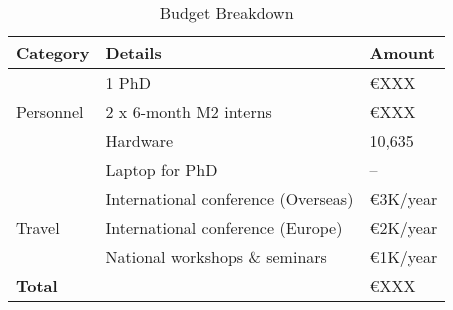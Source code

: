 \documentclass[11pt, a4paper]{article}
\begin{document}

\begin{table}[H]
    \centering
   \caption{Budget Breakdown}
    \begin{tabular}{ll|l}
        \toprule
        \textbf{Category} & \textbf{Details} & \textbf{Amount} \\
        \midrule
        \multirow{3}{*}{Personnel} 
            & 1 PhD & €XXX \\
            & 2 x 6-month M2 interns & €XXX \\
        \midrule
        \multirow{2}{*}{Equipment} 
            & Hardware & 10,635 \\
            & Laptop for PhD & -- \\
        \midrule
        \multirow{3}{*}{Travel} 
            & International conference (Overseas) & €3K/year \\
            & International conference (Europe) & €2K/year \\
            & National workshops \& seminars & €1K/year \\
        \midrule
        \textbf{Total} &  & €XXX \\
        \bottomrule
    \end{tabular}
    \label{tab:budget}
\end{table}
\newpage
\end{document}
